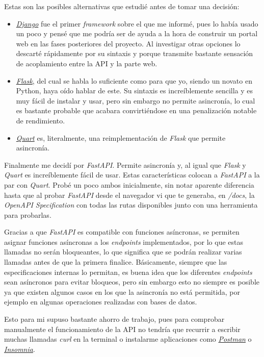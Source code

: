 Estas son las posibles alternativas que estudié antes de tomar una decisión:
\begin{itemize}
    \item \href{https://www.djangoproject.com/}{\textit{Django}} fue el primer \textit{framework} sobre el que me informé, pues lo había usado un poco y pensé que me podría ser de ayuda a la hora de construir un portal web en las fases posteriores del proyecto. Al investigar otras opciones lo descarté rápidamente por su sintaxis y porque transmite bastante sensación de acoplamiento entre la API y la parte web.
    \item \href{https://flask.palletsprojects.com/en/2.2.x/}{\textit{Flask}}, del cual se habla lo suficiente como para que yo, siendo un novato en Python, haya oído hablar de este. Su sintaxis es increíblemente sencilla y es muy fácil de instalar y usar, pero sin embargo no permite asincronía, lo cual es bastante probable que acabara convirtiéndose en una penalización notable de rendimiento.
    \item \href{https://quart.palletsprojects.com/en/latest/}{\textit{Quart}} es, literalmente, una reimplementación de \textit{Flask} que permite asincronía.
\end{itemize}

Finalmente me decidí por \textit{FastAPI}. Permite asincronía y, al igual que \textit{Flask} y \textit{Quart} es increíblemente fácil de usar. Estas características colocan a \textit{FastAPI} a la par con \textit{Quart}. Probé un poco ambos inicialmente, sin notar aparente diferencia hasta que al probar \textit{FastAPI} desde el navegador vi que te generaba, en \textit{/docs}, la \textit{OpenAPI Specification} con todas las rutas disponibles junto con una herramienta para probarlas.

Gracias a que \textit{FastAPI} es compatible con funciones asíncronas, se permiten asignar funciones asíncronas a los \textit{endpoints} implementados, por lo que estas llamadas no serán bloqueantes, lo que significa que se podrán realizar varias llamadas antes de que la primera finalice. Básicamente, siempre que las especificaciones internas lo permitan, es buena idea que los diferentes \textit{endpoints} sean asíncronos para evitar bloqueos, pero sin embargo esto no siempre es posible ya que existen algunos casos en los que la asincronía no está permitida, por ejemplo en algunas operaciones realizadas con bases de datos.

Esto para mi supuso bastante ahorro de trabajo, pues para comprobar manualmente el funcionamiento de la API no tendría que recurrir a escribir muchas llamadas \textit{curl} en la terminal o instalarme aplicaciones como \href{https://www.postman.com/}{\textit{Postman}} o \href{https://insomnia.rest/}{\textit{Insomnia}}.

